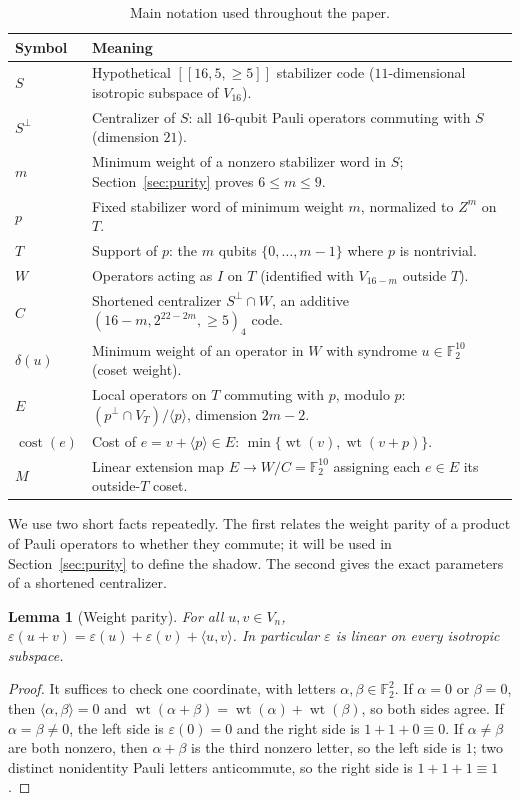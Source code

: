 \documentclass[11pt]{article}
\newtheorem{lemma}[theorem]{Lemma}
\theoremstyle{definition}
\theoremstyle{remark}
\newcommand{\F}{\mathbb F_2}
\newcommand{\qc}[1]{[\![#1]\!]}
\newcommand{\wt}{\operatorname{wt}}
\newcommand{\cost}{\operatorname{cost}}
\begin{document}
\begin{table}[htbp]
\centering\small
\caption{Main notation used throughout the paper.}\label{tab:notation}
\begin{tabularx}{\textwidth}{@{}lX@{}}
\toprule
Symbol & Meaning \\\midrule
\(S\) & Hypothetical \(\qc{16,5,{\geq}5}\) stabilizer code (\(11\)-dimensional isotropic subspace of \(V_{16}\)). \\
\(S^\perp\) & Centralizer of \(S\): all \(16\)-qubit Pauli operators commuting with \(S\) (dimension \(21\)). \\
\(m\) & Minimum weight of a nonzero stabilizer word in \(S\); Section~\ref{sec:purity} proves \(6\leq m\leq9\). \\
\(p\) & Fixed stabilizer word of minimum weight \(m\), normalized to \(Z^m\) on \(T\). \\
\(T\) & Support of \(p\): the \(m\) qubits \(\{0,\ldots,m-1\}\) where \(p\) is nontrivial. \\
\(W\) & Operators acting as \(I\) on \(T\) (identified with \(V_{16-m}\) outside \(T\)). \\
\(C\) & Shortened centralizer \(S^\perp\cap W\), an additive \((16-m,2^{22-2m},{\geq}5)_4\) code. \\
\(\delta(u)\) & Minimum weight of an operator in \(W\) with syndrome \(u\in\F^{10}\) (coset weight). \\
\(E\) & Local operators on \(T\) commuting with \(p\), modulo \(p\): \((p^\perp\cap V_T)/\langle p\rangle\), dimension \(2m-2\). \\
\(\cost(e)\) & Cost of \(e=v+\langle p\rangle\in E\): \(\min\{\wt(v),\wt(v+p)\}\). \\
\(M\) & Linear extension map \(E\to W/C=\F^{10}\) assigning each \(e\in E\) its outside-\(T\) coset. \\
\bottomrule
\end{tabularx}
\end{table}

We use two short facts repeatedly. The first relates the weight parity
of a product of Pauli operators to whether they commute; it will be used
in Section~\ref{sec:purity} to define the shadow. The second gives the
exact parameters of a shortened centralizer.

\begin{lemma}[Weight parity]\label{lem:parity-linear}
For all \(u,v\in V_n\),
\(\varepsilon(u+v)=\varepsilon(u)+\varepsilon(v)+\langle u,v\rangle\).
In particular \(\varepsilon\) is linear on every isotropic subspace.
\end{lemma}
\begin{proof}
It suffices to check one coordinate, with letters \(\alpha,\beta\in\F^2\).
If \(\alpha=0\) or \(\beta=0\), then \(\langle\alpha,\beta\rangle=0\)
and \(\wt(\alpha+\beta)=\wt(\alpha)+\wt(\beta)\), so both sides agree.
If \(\alpha=\beta\ne0\), the left side is \(\varepsilon(0)=0\) and the
right side is \(1+1+0\equiv0\). If \(\alpha\ne\beta\) are both nonzero,
then \(\alpha+\beta\) is the third nonzero letter, so the left side is
\(1\); two distinct nonidentity Pauli letters anticommute, so the right
side is \(1+1+1\equiv1\).
\end{proof}
\end{document}
